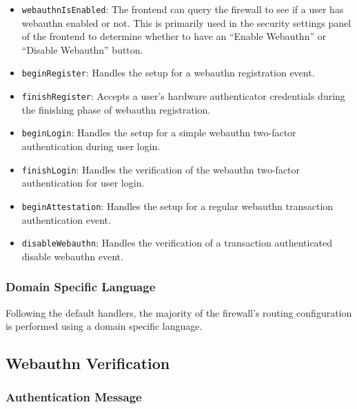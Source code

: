 \begin{itemize}[nosep]
\item \lstinline{webauthnIsEnabled}: The frontend can query the firewall to see if a user has webauthn enabled or not. This is primarily used in the security settings panel of the frontend to determine whether to  have an ``Enable Webauthn'' or ``Disable Webauthn'' button.

\item \lstinline{beginRegister}: Handles the setup for a webauthn registration event.

\item \lstinline{finishRegister}: Accepts a user's hardware authenticator credentials during the finishing phase of webauthn registration.

\item \lstinline{beginLogin}: Handles the setup for a simple webauthn two-factor authentication during user login.

\item \lstinline{finishLogin}: Handles the verification of the webauthn two-factor authentication for user login.

\item \lstinline{beginAttestation}: Handles the setup for a regular webauthn transaction authentication event.

\item \lstinline{disableWebauthn}: Handles the verification of a transaction authenticated disable webauthn event.

\end{itemize}

\subsubsection{Domain Specific Language}

Following the default handlers, the majority of the firewall's routing configuration is performed using a domain specific language. 



\subsection{Webauthn Verification}

\subsubsection{Authentication Message}\label{Sec:AuthenticationMessage}

